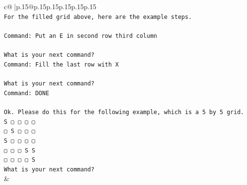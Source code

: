 \documentclass{article}
\begin{document}
{\begin{supertabular}{c@{$\;$}|p{.15\linewidth}@{}p{.15\linewidth}p{.15\linewidth}p{.15\linewidth}p{.15\linewidth}p{.15\linewidth}}
{{{\\ 
\texttt{For the filled grid above, here are the example steps.} \\
\\ 
\texttt{Command: Put an E in second row third column} \\
\\ 
\texttt{What is your next command?} \\
\texttt{Command: Fill the last row with X} \\
\\ 
\texttt{What is your next command?} \\
\texttt{Command: DONE} \\
\\ 
\texttt{Ok. Please do this for the following example, which is a 5 by 5 grid.} \\
\texttt{S ▢ ▢ ▢ ▢} \\
\texttt{▢ S ▢ ▢ ▢} \\
\texttt{S ▢ ▢ ▢ ▢} \\
\texttt{▢ ▢ ▢ S S} \\
\texttt{▢ ▢ ▢ ▢ S} \\
\texttt{What is your next command?} \\
            }
        }
    }
    & \\ \\


\end{supertabular}}
\end{document}
